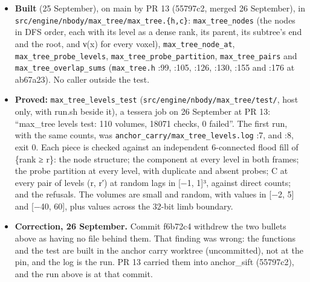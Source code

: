 \begin{itemize}
a rectangle sum over the two DFS ranges, and one Fenwick sweep of J answers every asked pair of levels. The census (one partner, unpaired, mutual, forked) is the degrees of the support of C at the chosen levels. The tracker's overlap still recounts per sampled cut (built on the engine side on main by PR 13, 55797c2: \texttt{max\_\allowbreak{}tree\_\allowbreak{}pairs} and \texttt{max\_\allowbreak{}tree\_\allowbreak{}overlap\_\allowbreak{}sums}, one Fenwick sweep instead of a summed-area table; proved against direct counts).
\item \textbf{Built} (25 September), on main by PR 13 (55797c2, merged 26 September), in \texttt{src/\allowbreak{}engine/\allowbreak{}nbody/\allowbreak{}max\_\allowbreak{}tree/\allowbreak{}max\_\allowbreak{}tree.\allowbreak{}\{h,c\}}: \texttt{max\_\allowbreak{}tree\_\allowbreak{}nodes} (the nodes in DFS order, each with its level as a dense rank, its parent, its subtree's end and the root, and ν(x) for every voxel), \texttt{max\_\allowbreak{}tree\_\allowbreak{}node\_\allowbreak{}at}, \texttt{max\_\allowbreak{}tree\_\allowbreak{}probe\_\allowbreak{}levels}, \texttt{max\_\allowbreak{}tree\_\allowbreak{}probe\_\allowbreak{}partition}, \texttt{max\_\allowbreak{}tree\_\allowbreak{}pairs} and \texttt{max\_\allowbreak{}tree\_\allowbreak{}overlap\_\allowbreak{}sums} (\texttt{max\_\allowbreak{}tree.\allowbreak{}h} :99, :105, :126, :130, :155 and :176 at ab67a23). No caller outside the test.
\item \textbf{Proved:} \texttt{max\_\allowbreak{}tree\_\allowbreak{}levels\_\allowbreak{}test} (\texttt{src/\allowbreak{}engine/\allowbreak{}nbody/\allowbreak{}max\_\allowbreak{}tree/\allowbreak{}test/\allowbreak{}}, host only, with run.sh beside it), a tessera job on 26 September at PR 13: “max\_\allowbreak{}tree levels test: 110 volumes, 18071 checks, 0 failed”. The first run, with the same counts, was \texttt{anchor\_\allowbreak{}carry/\allowbreak{}max\_\allowbreak{}tree\_\allowbreak{}levels.\allowbreak{}log} :7, and :8, exit 0. Each piece is checked against an independent 6-connected flood fill of \{rank ≥ r\}: the node structure; the component at every level in both frames; the probe partition at every level, with duplicate and absent probes; C at every pair of levels (r, r′) at random lags in [−1, 1]³, against direct counts; and the refusals. The volumes are small and random, with values in [−2, 5] and [−40, 60], plus values across the 32-bit limb boundary.
\item \textbf{Correction, 26 September.} Commit f6b72c4 withdrew the two bullets above as having no file behind them. That finding was wrong: the functions and the test are built in the anchor carry worktree (uncommitted), not at the pin, and the log is the run. PR 13 carried them into anchor\_\allowbreak{}sift (55797c2), and the run above is at that commit.

\end{itemize}
